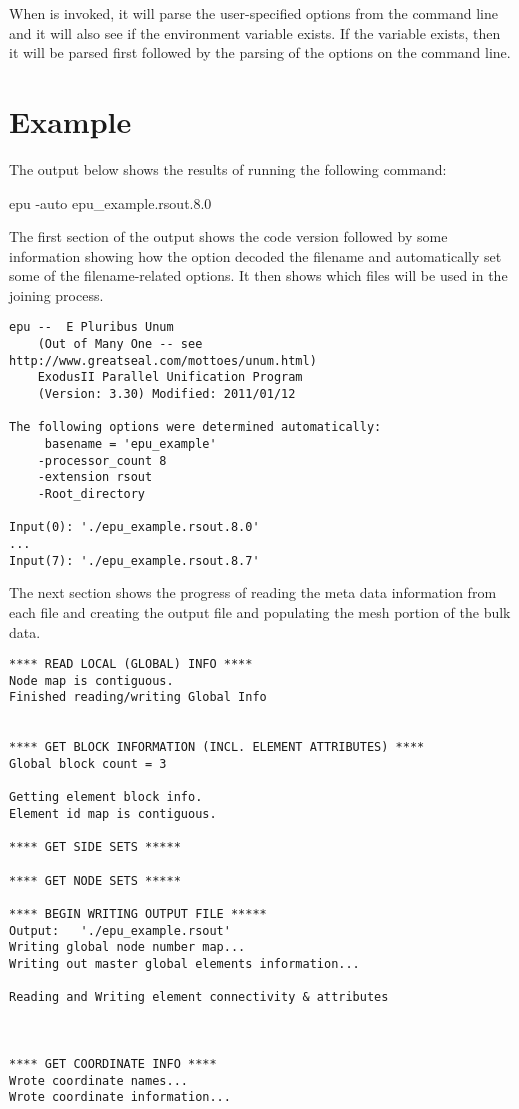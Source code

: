 When \epu{} is invoked, it will parse the user-specified options from
the command line and it will also see if the environment variable
 exists.  If the variable exists, then it will be
parsed first followed by the parsing of the options on the command line.

\section{Example}
The output below shows the results of running the following command:
\begin{syntax}
	epu -auto epu_example.rsout.8.0
\end{syntax}

The first section of the output shows the code version followed by some
information showing how the  option decoded the filename
and automatically set some of the filename-related options.  It then
shows which files will be used in the joining process.

\begin{verbatim}
epu --  E Pluribus Unum
	(Out of Many One -- see http://www.greatseal.com/mottoes/unum.html)
	ExodusII Parallel Unification Program
	(Version: 3.30) Modified: 2011/01/12

The following options were determined automatically:
	 basename = 'epu_example'
	-processor_count 8
	-extension rsout
	-Root_directory

Input(0): './epu_example.rsout.8.0'
...
Input(7): './epu_example.rsout.8.7'
\end{verbatim}

\sectionline
The next section shows the progress of reading the meta data
information from each file and creating the output file and populating
the mesh portion of the bulk data.

\begin{verbatim}
**** READ LOCAL (GLOBAL) INFO ****
Node map is contiguous.
Finished reading/writing Global Info


**** GET BLOCK INFORMATION (INCL. ELEMENT ATTRIBUTES) ****
Global block count = 3

Getting element block info.
Element id map is contiguous.

**** GET SIDE SETS *****

**** GET NODE SETS *****

**** BEGIN WRITING OUTPUT FILE *****
Output:   './epu_example.rsout'
Writing global node number map...
Writing out master global elements information...

Reading and Writing element connectivity & attributes



**** GET COORDINATE INFO ****
Wrote coordinate names...
Wrote coordinate information...

\end{verbatim}

